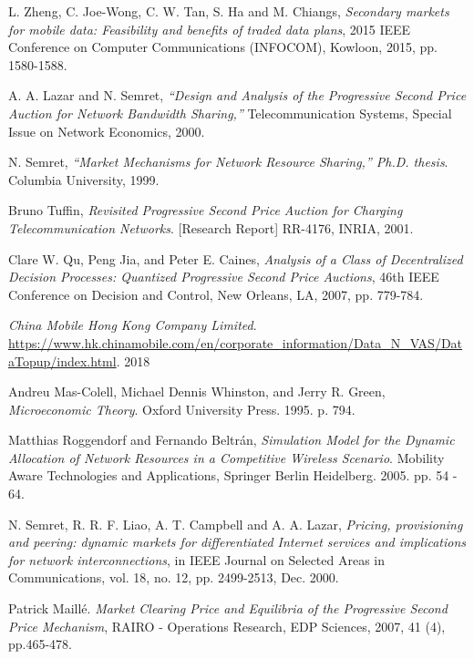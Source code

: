 \documentclass[sigconf, anonymous]{acmart}
\theoremstyle{definition}
\begin{document}
\begin{thebibliography}{9}

L. Zheng, C. Joe-Wong, C. W. Tan, S. Ha and M. Chiangs, 
\textit{Secondary markets for mobile data: Feasibility and benefits of traded
data plans}, 2015 IEEE
Conference on Computer Communications (INFOCOM), Kowloon, 2015, pp. 1580-1588.

A. A. Lazar and N. Semret, 
\textit{“Design and Analysis of the Progressive Second Price Auction for Network
Bandwidth Sharing,”} Telecommunication Systems, Special Issue on Network Economics, 2000.

N. Semret, 
\textit{“Market Mechanisms for Network Resource Sharing,”
Ph.D. thesis}. 
Columbia University, 1999.

Bruno Tuffin,
\textit{Revisited Progressive Second Price Auction for Charging
Telecommunication Networks}.
[Research Report] RR-4176, INRIA, 2001.

Clare W. Qu, Peng Jia, and Peter E. Caines,
\textit{Analysis of a Class of Decentralized Decision Processes: Quantized
Progressive Second Price Auctions},
46th IEEE Conference on Decision and Control, New Orleans, LA, 2007, pp.
779-784.

\textit{China Mobile Hong Kong Company Limited}.
\url{https://www.hk.chinamobile.com/en/corporate_information/Data_N_VAS/DataTopup/index.html}.
2018

Andreu Mas-Colell, Michael Dennis Whinston, and Jerry R. Green, 
\textit{Microeconomic Theory}. Oxford University Press. 1995. p. 794.

Matthias Roggendorf and Fernando Beltr{\'a}n,
\textit{Simulation Model for the Dynamic Allocation of Network Resources in a
Competitive Wireless Scenario}. Mobility Aware Technologies and Applications, Springer Berlin Heidelberg. 2005.
pp. 54 - 64.

N. Semret, R. R. F. Liao, A. T. Campbell and A. A. Lazar, 
\textit{Pricing, provisioning and peering: dynamic markets for differentiated Internet services and
implications for network interconnections}, in IEEE Journal on Selected Areas in
Communications, vol. 18, no. 12, pp. 2499-2513, Dec. 2000.

Patrick Maillé.
\textit{Market Clearing Price and Equilibria of the Progressive Second Price
Mechanism},
RAIRO - Operations Research, EDP Sciences, 2007, 41 (4), pp.465-478.

\end{thebibliography}
\end{document}
